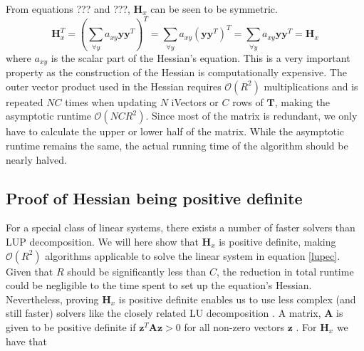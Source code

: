 From equations ??? and ???, $\mathbf{H}_x$ can be seen to be symmetric.
\begin{equation}\label{symproof}
\mathbf{H}_x^T = \left(\sum_{\forall y}a_{xy}\mathbf{y}\mathbf{y}^T\right)^T = 
\sum_{\forall y}a_{xy}\left(\mathbf{y}\mathbf{y}^T\right)^T =
 \sum_{\forall y}a_{xy}\mathbf{y}\mathbf{y}^T = \mathbf{H}_x
\end{equation}
where $a_{xy}$ is the scalar part of the Hessian's equation. This is a very important property as the construction of the Hessian is computationally expensive. The outer vector product used in the Hessian requires $\mathcal{O}(R^2)$ multiplications and is repeated $NC$ times when updating $N$ iVectors or $C$ rows of $\mathbf{T}$, making the asymptotic runtime $\mathcal{O}(NCR^2)$.  Since most of the matrix is redundant, we only have to calculate the upper or lower half of the matrix. While the asymptotic runtime remains the same, the actual running time of the algorithm should be nearly halved.

\subsection{Proof of Hessian being positive definite}
\label{posdef}

For a special class of linear systems, there exists a number of faster solvers than LUP decomposition. We will here show that $\mathbf{H}_x$ is positive definite, making $\mathcal{O}(R^2)$ algorithms applicable \cite{tewfik1994fast} to solve the linear system in equation \ref{lupec}. Given that $R$ should be significantly less than $C$, the reduction in total runtime could be negligible to the time spent to set up the equation's Hessian. Nevertheless, proving $\mathbf{H}_x$ is positive definite enables us to use less complex (and still faster) solvers like the closely related LU decomposition \cite[p. 749]{cormen}. A matrix, $\mathbf{A}$ is given to be positive definite if $\mathbf{z}^T\mathbf{Az} > 0$ for all non-zero vectors $\mathbf{z}$ \cite[p. 246]{matte3}. For $\mathbf{H}_x$ we have that

